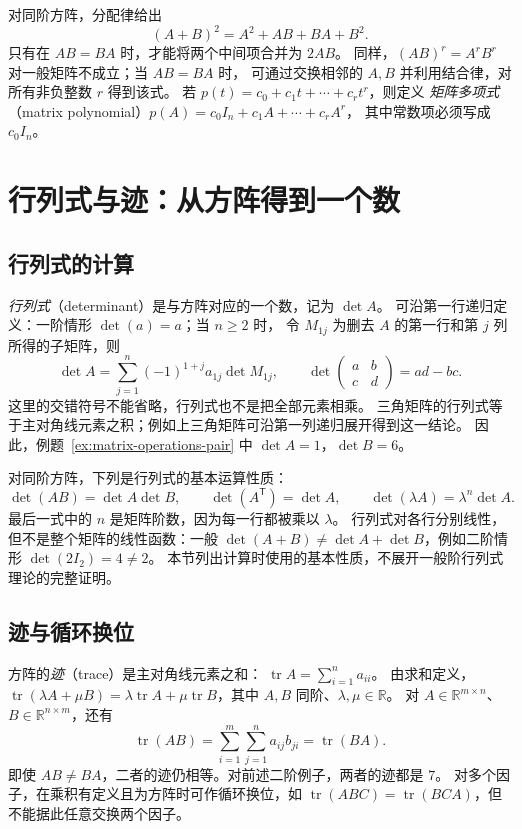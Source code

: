 \documentclass[UTF8,12pt,a4paper,fontset=fandol]{ctexart}
\begin{document}
对同阶方阵，分配律给出
\[
  (A+B)^2=A^2+AB+BA+B^2.
\]
只有在 $AB=BA$ 时，才能将两个中间项合并为 $2AB$。
同样，$(AB)^r=A^rB^r$ 对一般矩阵不成立；当 $AB=BA$ 时，
可通过交换相邻的 $A,B$ 并利用结合律，对所有非负整数 $r$ 得到该式。
若 $p(t)=c_0+c_1t+\cdots+c_rt^r$，则定义
\emph{矩阵多项式}（matrix polynomial）$p(A)=c_0I_n+c_1A+\cdots+c_rA^r$，
其中常数项必须写成 $c_0I_n$。

\section{行列式与迹：从方阵得到一个数}
\label{sec:matrix-determinant-trace}

\subsection{行列式的计算}

\emph{行列式}（determinant）是与方阵对应的一个数，记为 $\det A$。
可沿第一行递归定义：一阶情形 $\det(a)=a$；当 $n\ge2$ 时，
令 $M_{1j}$ 为删去 $A$ 的第一行和第 $j$ 列所得的子矩阵，则
\[
  \det A=\sum_{j=1}^n(-1)^{1+j}a_{1j}\det M_{1j},\qquad
  \det\begin{pmatrix}a&b\\c&d\end{pmatrix}=ad-bc.
\]
这里的交错符号不能省略，行列式也不是把全部元素相乘。
三角矩阵的行列式等于主对角线元素之积；例如上三角矩阵可沿第一列递归展开得到这一结论。
因此，例题~\ref{ex:matrix-operations-pair} 中 $\det A=1$，$\det B=6$。

对同阶方阵，下列是行列式的基本运算性质：
\[
  \det(AB)=\det A\det B,\qquad
  \det(A^{\mathsf T})=\det A,\qquad
  \det(\lambda A)=\lambda^n\det A.
\]
最后一式中的 $n$ 是矩阵阶数，因为每一行都被乘以 $\lambda$。
行列式对各行分别线性，但不是整个矩阵的线性函数：一般
$\det(A+B)\ne\det A+\det B$，例如二阶情形 $\det(2I_2)=4\ne2$。
本节列出计算时使用的基本性质，不展开一般阶行列式理论的完整证明。

\subsection{迹与循环换位}

方阵的\emph{迹}（trace）是主对角线元素之和：
$\operatorname{tr}A=\sum_{i=1}^n a_{ii}$。
由求和定义，$\operatorname{tr}(\lambda A+\mu B)
=\lambda\operatorname{tr}A+\mu\operatorname{tr}B$，其中 $A,B$ 同阶、$\lambda,\mu\in\mathbb R$。
对 $A\in\mathbb R^{m\times n}$、$B\in\mathbb R^{n\times m}$，还有
\[
  \operatorname{tr}(AB)=\sum_{i=1}^m\sum_{j=1}^n a_{ij}b_{ji}
  =\operatorname{tr}(BA).
\]
即使 $AB\ne BA$，二者的迹仍相等。对前述二阶例子，两者的迹都是 $7$。
对多个因子，在乘积有定义且为方阵时可作循环换位，如
$\operatorname{tr}(ABC)=\operatorname{tr}(BCA)$，但不能据此任意交换两个因子。
\end{document}
